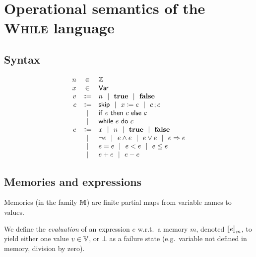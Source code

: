 \documentclass[10pt]{article}
\theoremstyle{definition}
\begin{document}
\section{Operational semantics of the \textsc{While} language}

\subsection*{Syntax}

\newcommand*{\ALT}{\ \ |\ \ }

\begin{displaymath}
\begin{array}{rcl}
    n & \in & \Z \\
    x & \in  & \domvar \\
    v & \bnf & n \ALT \True \ALT \False \\
    c & \bnf & \Skip \ALT \Assn x = e
        \ALT \Seq c ; c \\
    & | & \ITE e then c else c \\
    & | & \While e do c \\
    e & \bnf & x \ALT n \ALT \True \ALT \False \\
    & | & \neg e \ALT e \wedge e \ALT e \vee e \ALT e \Rightarrow e \\
    & | & e = e \ALT e < e \ALT e \leq e \\
    & | & e + e \ALT e - e
\end{array}
\end{displaymath}

\subsection*{Memories and expressions}

Memories (in the family $\mathbb{M}$) are finite partial maps from variable names to values.


We define the \emph{evaluation} of an expression $e$
w.r.t.\ a memory $m$, denoted $\Eval(e,m)$,
to yield either one value $v \in \mathbb{V}$,
or $\bot$ as a failure state
(e.g.\ variable not defined in memory, division by zero).
\end{document}
